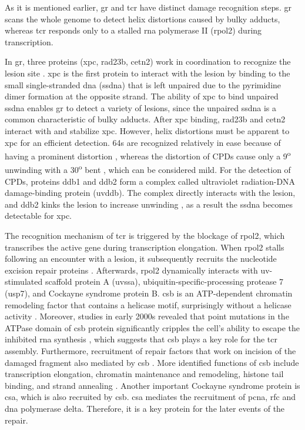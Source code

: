 As it is mentioned earlier, \gls{gr} and \gls{tcr} have distinct damage recognition steps. \gls{gr} scans the whole genome to detect helix distortions caused by bulky adducts, whereas \gls{tcr} responds only to a stalled \gls{rna} polymerase II (\gls{rpol2}) during transcription. 

In \gls{gr}, three proteins (\gls{xpc}, \gls{rad23b}, \gls{cetn2}) work in coordination to recognize the lesion site \citep{sugasawa1998xeroderma}. \gls{xpc} is the first protein to interact with the lesion by binding to the small single-stranded \gls{dna} (\gls{ssdna}) that is left unpaired due to the pyrimidine dimer formation at the opposite strand. The ability of \gls{xpc} to bind unpaired \gls{ssdna} enables \gls{gr} to detect a variety of lesions, since the unpaired \gls{ssdna} is a common characteristic of bulky adducts. After \gls{xpc} binding, \gls{rad23b} and \gls{cetn2} interact with and stabilize \gls{xpc}. However, helix distortions must be apparent to \gls{xpc} for an efficient detection. \gls{64}s are recognized relatively in ease because of having a prominent distortion \citep{mizukoshi2001structural}, whereas the distortion of \gls{CPD}s cause only a 9\textsuperscript{o} unwinding with a 30\textsuperscript{o} bent \citep{park2002crystal}, which can be considered mild. For the detection of \gls{CPD}s, proteins \gls{ddb1} and \gls{ddb2} form a complex called ultraviolet radiation-DNA damage-binding protein (\gls{uvddb}). The complex directly interacts with the lesion, and \gls{ddb2} kinks the lesion to increase unwinding \citep{scrima2008structural}, as a result the \gls{ssdna} becomes detectable for \gls{xpc}. 

The recognition mechanism of \gls{tcr} is triggered by the blockage of \gls{rpol2}, which transcribes the active gene during transcription elongation. When \gls{rpol2} stalls following an encounter with a lesion, it subsequently recruits the nucleotide excision repair proteins \citep{svejstrup2002mechanisms}. Afterwards, \gls{rpol2} dynamically interacts with \gls{uv}-stimulated scaffold protein A (\gls{uvssa}), ubiquitin-specific-processing protease 7 (\gls{usp7}), and Cockayne syndrome protein B. \gls{csb} is an ATP-dependent chromatin remodeling factor that contains a helicase motif, surprisingly without a helicase activity \citep{selby1997human}. Moreover, studies in early 2000s revealed that point mutations in the ATPase domain of \gls{csb} protein significantly cripples the cell’s ability to escape the inhibited \gls{rna} synthesis \citep{citterio1998biochemical,muftuoglu2002phenotypic}, which suggests that \gls{csb} plays a key role for the \gls{tcr} assembly. Furthermore, recruitment of repair factors that work on incision of the damaged fragment also mediated by \gls{csb} \citep{fousteri2006cockayne}. More identified functions of \gls{csb} include transcription elongation, chromatin maintenance and remodeling, histone tail binding, and strand annealing \citep{selby1997cockayne}. Another important Cockayne syndrome protein is \gls{csa}, which is also recruited by \gls{csb}. \gls{csa} mediates the recruitment of \gls{pcna}, \gls{rfc} and \gls{dna} polymerase \gls{delta}. Therefore, it is a key protein for the later events of the repair.

